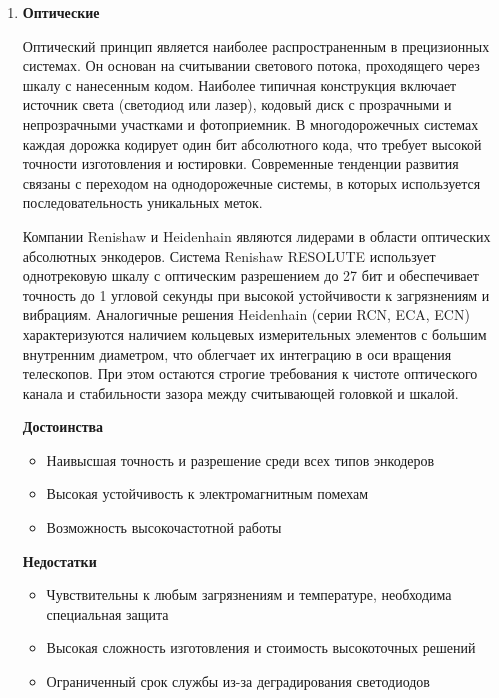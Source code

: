 \begin{enumerate}
\textbf{Недостатки}:
\begin{itemize}
    \item Есть существенные ограничения для датчиков на основе вихревых токов: сильная зависимость от температуры, чувствительность сильно зависит от расстояния между частями энкодера, разрешающая способность зависит от глубины скин-слоя материала статора.
\end{itemize}

\item \textbf{Оптические} 

Оптический принцип является наиболее распространенным в прецизионных системах. Он основан на считывании светового потока, проходящего через шкалу с нанесенным кодом. Наиболее типичная конструкция включает источник света (светодиод или лазер), кодовый диск с прозрачными и непрозрачными участками и фотоприемник. В многодорожечных системах каждая дорожка кодирует один бит абсолютного кода, что требует высокой точности изготовления и юстировки. Современные тенденции развития связаны с переходом на однодорожечные системы, в которых используется последовательность уникальных меток.  

Компании Renishaw и Heidenhain являются лидерами в области оптических абсолютных энкодеров. Система Renishaw RESOLUTE использует однотрековую шкалу с оптическим разрешением до 27 бит и обеспечивает точность до 1 угловой секунды при высокой устойчивости к загрязнениям и вибрациям. Аналогичные решения Heidenhain (серии RCN, ECA, ECN) характеризуются наличием кольцевых измерительных элементов с большим внутренним диаметром, что облегчает их интеграцию в оси вращения телескопов. При этом остаются строгие требования к чистоте оптического канала и стабильности зазора между считывающей головкой и шкалой.  

\textbf{Достоинства}
\begin{itemize}
    \item Наивысшая точность и разрешение среди всех типов энкодеров
    \item Высокая устойчивость к электромагнитным помехам
    \item Возможность высокочастотной работы
\end{itemize}

\textbf{Недостатки}
\begin{itemize}
    \item Чувствительны к любым загрязнениям и температуре, необходима специальная защита
    \item Высокая сложность изготовления и стоимость высокоточных решений
    \item Ограниченный срок службы из-за деградирования светодиодов
\end{itemize}


\end{enumerate}
